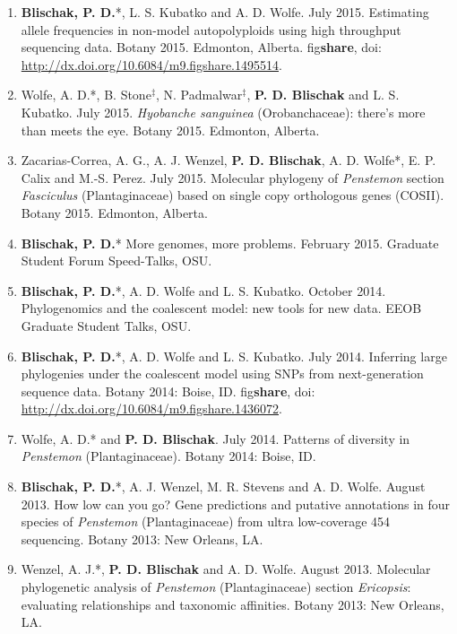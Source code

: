 \documentclass[]{article}
\begin{document}
\begin{enumerate}
\def\labelenumi{\arabic{enumi}.}
\setcounter{enumi}{8}
\item
  \textbf{Blischak, P. D.}*, L. S. Kubatko and A. D. Wolfe. July 2015.
  Estimating allele frequencies in non-model autopolyploids using high
  throughput sequencing data. Botany 2015. Edmonton, Alberta.
  fig\textbf{share}, doi:
  \href{http://dx.doi.org/10.6084/m9.figshare.1495514}{\url{http://dx.doi.org/10.6084/m9.figshare.1495514}}.
\item
  Wolfe, A. D.*, B. Stone\(^{\ddagger}\), N. Padmalwar\(^{\ddagger}\),
  \textbf{P. D. Blischak} and L. S. Kubatko. July 2015. \emph{Hyobanche
  sanguinea} (Orobanchaceae): there's more than meets the eye. Botany
  2015. Edmonton, Alberta.
\item
  Zacarias-Correa, A. G., A. J. Wenzel, \textbf{P. D. Blischak}, A. D.
  Wolfe*, E. P. Calix and M.-S. Perez. July 2015. Molecular phylogeny of
  \emph{Penstemon} section \emph{Fasciculus} (Plantaginaceae) based on
  single copy orthologous genes (COSII). Botany 2015. Edmonton, Alberta.
\item
  \textbf{Blischak, P. D.}* More genomes, more problems. February 2015.
  Graduate Student Forum Speed-Talks, OSU.
\item
  \textbf{Blischak, P. D.}*, A. D. Wolfe and L. S. Kubatko. October
  2014. Phylogenomics and the coalescent model: new tools for new data.
  EEOB Graduate Student Talks, OSU.
\item
  \textbf{Blischak, P. D.}*, A. D. Wolfe and L. S. Kubatko. July 2014.
  Inferring large phylogenies under the coalescent model using SNPs from
  next-generation sequence data. Botany 2014: Boise, ID.
  fig\textbf{share}, doi:
  \href{http://dx.doi.org/10.6084/m9.figshare.1436072}{\url{http://dx.doi.org/10.6084/m9.figshare.1436072}}.
\item
  Wolfe, A. D.* and \textbf{P. D. Blischak}. July 2014. Patterns of
  diversity in \emph{Penstemon} (Plantaginaceae). Botany 2014: Boise,
  ID.
\item
  \textbf{Blischak, P. D.}*, A. J. Wenzel, M. R. Stevens and A. D.
  Wolfe. August 2013. How low can you go? Gene predictions and putative
  annotations in four species of \emph{Penstemon} (Plantaginaceae) from
  ultra low-coverage 454 sequencing. Botany 2013: New Orleans, LA.
\item
  Wenzel, A. J.*, \textbf{P. D. Blischak} and A. D. Wolfe. August 2013.
  Molecular phylogenetic analysis of \emph{Penstemon} (Plantaginaceae)
  section \emph{Ericopsis}: evaluating relationships and taxonomic
  affinities. Botany 2013: New Orleans, LA.
\end{enumerate}
\end{document}
